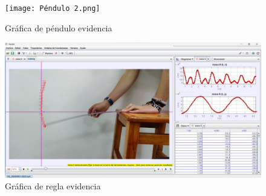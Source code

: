 \documentclass[a4paper]{article}
\begin{document}
\begin{figure} [H] 
    \centering
    \texttt{[image: Péndulo 2.png]}
    \caption{Gráfica de péndulo evidencia}
    \label{Péndulo 2}
\end{figure}

\begin{figure} [H] 
    \centering
    \includegraphics[scale=0.25]{Regla 2.png}
    \caption{Gráfica de regla evidencia}
    \label{Regla 2}
\end{figure}
\end{document}
